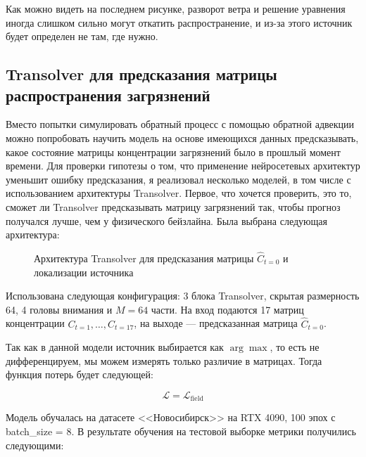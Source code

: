 \documentclass[12pt]{article}
\begin{document}
Как можно видеть на последнем рисунке, разворот ветра и решение уравнения иногда слишком сильно могут откатить распространение, и из-за этого источник будет определен не там, где нужно.

\subsection*{Transolver для предсказания матрицы распространения загрязнений}

Вместо попытки симулировать обратный процесс с помощью обратной адвекции можно попробовать научить модель на основе имеющихся данных предсказывать, какое состояние матрицы концентрации загрязнений было в прошлый момент времени. 
Для проверки гипотезы о том, что применение нейросетевых архитектур уменьшит ошибку предсказания, я реализовал несколько моделей, в том числе с использованием архитектуры Transolver.
Первое, что хочется проверить, это то, сможет ли Transolver предсказывать матрицу загрязнений так, чтобы прогноз получался лучше, чем у физического бейзлайна.
Была выбрана следующая архитектура:

\begin{figure}[h]
    \centering
    \caption{Архитектура Transolver для предсказания матрицы $\hat{C}_{t=0}$ и локализации источника}
    \label{fig:transolver_arch}
\end{figure}

Использована следующая конфигурация: 3 блока Transolver, скрытая размерность 64, 4 головы внимания и $M = 64$ части. На вход подаются 17 матриц концентрации $C_{t=1},\dots,C_{t=17}$, на выходе --- предсказанная матрица $\hat{C}_{t=0}$.

Так как в данной модели источник выбирается как $\arg\max$, то есть не дифференцируем, мы можем измерять только различие в матрицах. Тогда функция потерь будет следующей:

$$
\mathcal{L} = \mathcal{L}_{\text{field}}
$$

Модель обучалась на датасете <<Новосибирск>> на RTX 4090, 100 эпох с batch\_size = 8. В результате обучения на тестовой выборке метрики получились следующими:
\end{document}
